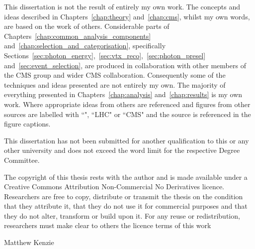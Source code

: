 \begin{declaration}
  This dissertation is not the result of entirely my own work. The concepts and ideas described in Chapters~\ref{chap:theory} and~\ref{chap:cms}, whilst my own words, are based on the work of others. Considerable parts of Chapters~\ref{chap:common_analysis_components} and~\ref{chap:selection_and_categorisation}, specifically Sections~\ref{sec:photon_energy},~\ref{sec:vtx_reco},~\ref{sec:photon_presel} and~\ref{sec:event_selection}, are produced in collaboration with other members of the \acs{CMS} \Hgg group and wider \acs{CMS} collaboration. Consequently some of the techniques and ideas presented are not entirely my own. The majority of everything presented in Chapters~\ref{chap:analysis} and~\ref{chap:results} is my own work. Where appropriate ideas from others are referenced and figures from other sources are labelled with ``\Hgg", ``LHC" or ``CMS" and the source is referenced in the figure captions. 
  
  This dissertation has not been submitted for another qualification to this or any other university and does not exceed the word limit for the respective Degree Committee.

The copyright of this thesis rests with the author and is made available under a Creative Commons Attribution Non-Commercial No Derivatives licence. Researchers are free to copy, distribute or transmit the thesis on the condition that they attribute it, that they do not use it for commercial purposes and that they do not alter, transform or build upon it. For any reuse or redistribution, researchers must make clear to others the licence terms of this work

  \vspace*{1cm}
  \begin{flushright}
    Matthew Kenzie
  \end{flushright}
\end{declaration}



